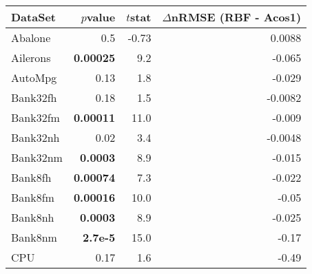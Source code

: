 %
\begin{tabular}{lrrr}
	\toprule
	\textbf{DataSet}    & \textbf{$p$\textendash{}value} & \textbf{$t$\textendash{}stat} & \textbf{$\Delta$nRMSE (RBF - Acos1)} \\\midrule
	Abalone             & 0.5                            & -0.73                         & 0.0088                               \\
	Ailerons            & \textbf{0.00025}               & 9.2                           & -0.065                               \\
	AutoMpg             & 0.13                           & 1.8                           & -0.029                               \\
	Bank32fh            & 0.18                           & 1.5                           & -0.0082                              \\
	Bank32fm            & \textbf{0.00011}               & 11.0                          & -0.009                               \\
	\addlinespace
	Bank32nh            & 0.02                           & 3.4                           & -0.0048                              \\
	Bank32nm            & \textbf{0.0003}                & 8.9                           & -0.015                               \\
	Bank8fh             & \textbf{0.00074}               & 7.3                           & -0.022                               \\
	Bank8fm             & \textbf{0.00016}               & 10.0                          & -0.05                                \\
	Bank8nh             & \textbf{0.0003}                & 8.9                           & -0.025                               \\
	\addlinespace
	Bank8nm             & \textbf{2.7e-5}                & 15.0                          & -0.17                                \\
	CPU                 & 0.17                           & 1.6                           & -0.49                                \\

\end{tabular}
